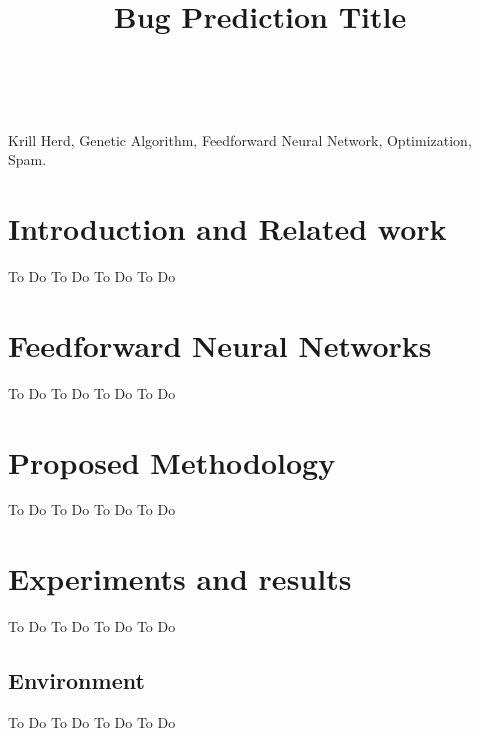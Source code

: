 \documentclass[conference]{IEEEtran}
\begin{document}
\title{Bug Prediction Title}

\author{\IEEEauthorblockN{ ,  ,  }
\\

}
\maketitle

\begin{abstract}

\end{abstract}
\begin{IEEEkeywords} Krill Herd, Genetic Algorithm, Feedforward Neural Network, Optimization, Spam. \end{IEEEkeywords}
\IEEEpeerreviewmaketitle


\section{Introduction and Related work}
 To Do To Do
 To Do To Do
\section{Feedforward Neural Networks}
\label{nn}
 To Do To Do
 To Do To Do

\section{Proposed Methodology}
 To Do To Do
 To Do To Do

\section{Experiments and results}
 To Do To Do
 To Do To Do

\subsection{Environment}
 To Do To Do
 To Do To Do
\end{document}
